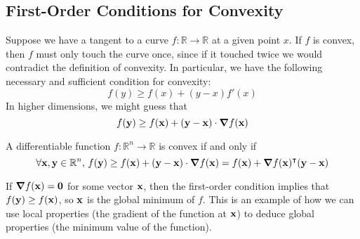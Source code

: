 \subsection{First-Order Conditions for Convexity}
Suppose we have a tangent to a curve \(f \colon \mathbb R \to \mathbb R\) at a given point \(x\).
If \(f\) is convex, then \(f\) must only touch the curve once, since if it touched twice we would contradict the definition of convexity.
In particular, we have the following necessary and sufficient condition for convexity:
\[ f(y) \geq f(x) + (y - x)f'(x) \]
In higher dimensions, we might guess that
\[ f(\vb y) \geq f(\vb x) + (\vb y - \vb x) \cdot \grad{f(\vb x)} \]
\begin{theorem}
    A differentiable function \(f \colon \mathbb R^n \to \mathbb R\) is convex if and only if
    \[ \forall \vb x, \vb y \in \mathbb R^n,\, f(\vb y) \geq f(\vb x) + (\vb y - \vb x) \cdot \grad{f(\vb x)} = f(\vb x) + \grad{f(\vb x)}^\intercal (\vb y - \vb x) \]
\end{theorem}
\begin{remark}
    If \(\grad{f(\vb x)} = \vb 0\) for some vector \(\vb x\), then the first-order condition implies that \(f(\vb y) \geq f(\vb x)\), so \(\vb x\) is the global minimum of \(f\).
    This is an example of how we can use local properties (the gradient of the function at \(\vb x\)) to deduce global properties (the minimum value of the function).
\end{remark}
